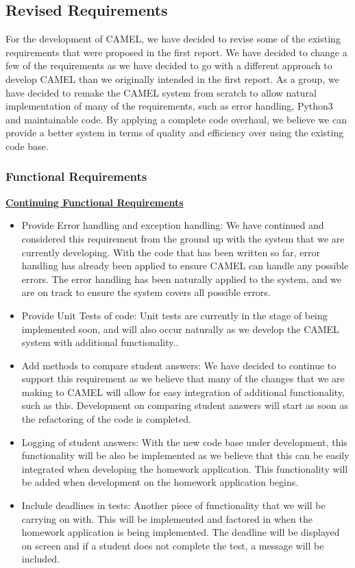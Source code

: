 \subsection{Revised Requirements}
	For the development of CAMEL, we have decided to revise some of the existing requirements that were proposed in the first report. We have decided to change a few of the requirements as we have decided to go with a different approach to develop CAMEL than we originally intended in the first report. As a group, we have decided to remake the CAMEL system from scratch to allow natural implementation of many of the requirements, such as error handling, Python3 and maintainable code. By applying a complete code overhaul, we believe we can provide a better system in terms of quality and efficiency over using the existing code base.\\    
	
	\subsubsection{Functional Requirements}
	\underline{\textbf{Continuing Functional Requirements}}
	\begin{itemize}
		\item Provide Error handling and exception handling: We have continued and considered this requirement from the ground up with the system that we are currently developing. With the code that has been written so far, error handling has already been applied to ensure CAMEL can handle any possible errors. The error handling has been naturally applied to the system, and we are on track to ensure the system covers all possible errors. 
		
		\item Provide Unit Tests of code: Unit tests are currently in the stage of being implemented soon, and will also occur naturally as we develop the CAMEL system with additional functionality.. 
		
		\item Add methods to compare student answers: We have decided to continue to support this requirement as we believe that many of the changes that we are making to CAMEL will allow for easy integration of additional functionality, such as this. Development on comparing student answers will start as soon as the refactoring of the code is completed.  
		
		\item Logging of student answers: With the new code base under development, this functionality will be also be implemented as we believe that this can be easily integrated when developing the homework application. This functionality will be added when development on the homework application begins.   
		
		\item Include deadlines in tests: Another piece of functionality that we will be carrying on with. This will be implemented and factored in when the homework application is being implemented. The deadline will be displayed on screen and if a student does not complete the test, a message will be included.    
	\end{itemize}
	
